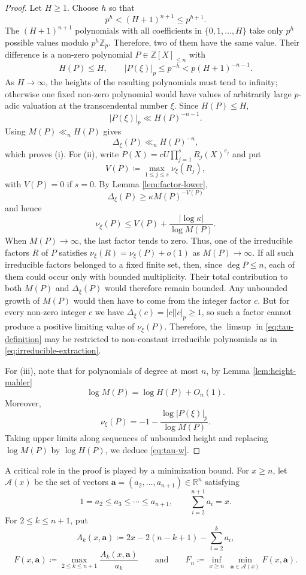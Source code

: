 \documentclass[12pt,reqno]{amsart}
\theoremstyle{definition}
\theoremstyle{remark}
\newcommand{\Z}{\mathbb Z}
\newcommand{\R}{\mathbb R}
\newcommand{\Zp}{\mathbb Z_p}
\newcommand{\calA}{\mathcal A}
\begin{document}
\begin{proof}
Let $H\geq1$. Choose $h$ so that
$$
p^h<(H+1)^{n+1}\leq p^{h+1}.
$$
The $(H+1)^{n+1}$ polynomials with all coefficients in $\{0,1,\ldots,H\}$ take only $p^h$ possible values modulo $p^h\Zp$. Therefore, two of them have the same value. Their difference is a non-zero polynomial $P\in\Z[X]_{\leq n}$ with
$$
H(P)\leq H,
\qquad |P(\xi)|_p\leq p^{-h}<p(H+1)^{-n-1}.
$$
As $H\to\infty$, the heights of the resulting polynomials must tend to infinity; otherwise one fixed non-zero polynomial would have values of arbitrarily large $p$-adic valuation at the transcendental number $\xi$. Since $H(P)\leq H$,
$$
|P(\xi)|_p\ll H(P)^{-n-1}.
$$
Using $M(P)\ll_n H(P)$ gives
$$
\Delta_\xi(P)\ll_n H(P)^{-n},
$$
which proves (i). For (ii), write
$P(X)=cU\prod_{j=1}^sR_j(X)^{e_j}$ and put
$$
V(P)\coloneqq\max_{1\leq j\leq s}\nu_\xi(R_j),
$$
with $V(P)=0$ if $s=0$. By Lemma \ref{lem:factor-lower},
$$
\Delta_\xi(P)\geq\kappa M(P)^{-V(P)}
$$
and hence
$$
\nu_\xi(P)\leq V(P)+\frac{|\log\kappa|}{\log M(P)}.
$$
When $M(P) \to\infty$, the last factor tends to zero. Thus, one of the irreducible factors $R$ of $P$ satisfies $\nu_\xi (R)=\nu_\xi(P)+o(1)$ as $M(P)\to\infty$. If all such irreducible factors belonged to a fixed finite set, then, since $\deg P\leq n$, each of them could occur only with bounded multiplicity. Their total contribution to both $M(P)$ and $\Delta_\xi(P)$ would therefore remain bounded. Any unbounded growth of $M(P)$ would then have to come from the integer factor $c$. But for every non-zero integer $c$ we have $\Delta_\xi(c)=|c||c|_p \geq 1$, so such a factor cannot produce a positive limiting value of $\nu_\xi(P)$. Therefore, the $\limsup$ in \eqref{eq:tau-definition} may be restricted to non-constant irreducible polynomials as in \eqref{eq:irreducible-extraction}.

For (iii), note that for polynomials of degree at most $n$, by Lemma \ref{lem:height-mahler}
$$
\log M(P)=\log H(P)+O_n(1).
$$
Moreover,
$$
\nu_\xi(P)
=
-1-\frac{\log|P(\xi)|_p}{\log M(P)}.
$$
Taking upper limits along sequences of unbounded height and replacing $\log M(P)$ by $\log H(P)$, we deduce \eqref{eq:tau-w}.
\end{proof}

A critical role in the proof is played by a minimization bound. For $x\geq n$, let $\calA(x)$ be the set of
vectors $\mathbf a=(a_2,\ldots,a_{n+1})\in\R^n$ satisfying
$$
1=a_2\leq a_3\leq\cdots\leq a_{n+1},
\qquad \sum_{i=2}^{n+1}a_i=x.
$$
For $2\leq k\leq n+1$, put
$$
A_k(x,\mathbf a)
\coloneqq2x-2(n-k+1)-\sum_{i=2}^k a_i,
$$
$$
F(x,\mathbf a)\coloneqq\max_{2\leq k\leq n+1}
\frac{A_k(x,\mathbf a)}{a_k}
\qquad \text{and}\qquad
F_n\coloneqq\inf_{x\geq n}\ \min_{\mathbf a\in\calA(x)}F(x,\mathbf a).
$$
\end{document}
